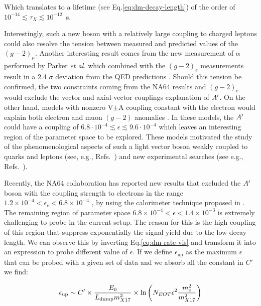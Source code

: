 Which translates to a lifetime (see Eq.\ref{eq:dm-decay-length}) of the order of $10^{-14}\lesssim \tau_X \lesssim 10^{-12}$~s.

Interestingly, such a new boson with a relatively large coupling to charged leptons could also resolve the tension between measured and predicted values of the $(g - 2)_{\mu}$. Another interesting result comes from the new measurement of $\alpha$ performed by Parker \textit{et al.} \cite{Parker191} which combined with the $(g-2)_e$ measurements result in a 2.4 $\sigma$ deviation from the QED predictions \cite{PhysRevLett.100.120801}. Should this tension be confirmed, the two constraints coming from the NA64 results and $(g - 2)_e$ would exclude the vector and axial-vector couplings explanation of $A'$. On the other hand, models with nonzero V$\pm$A coupling constant with the electron would explain both electron and muon $(g - 2)$ anomalies \cite{Krasnikov:2019dgh}. In these models, the $A'$ could have a coupling of $6.8\cdot 10^{-4} \lesssim \epsilon \lesssim 9.6 \cdot 10^{-4}$ which leaves an interesting region of the parameter space to be explored. These models motivated the study of the phenomenological aspects of such a light vector boson weakly coupled to quarks and leptons (see, e.g., Refs.~\cite{fayet1, fayet2, fayet3, fayet4,jk, cheng, Zhang:2017zap, ia, liang, bart}) and new experimental searches (see e.g., Refs.~\cite{battaglieri2017cosmic, nardi}).

Recently, the NA64 collaboration has reported new results that excluded the $A'$ boson  with the coupling strength  to electrons in the range $1.2 \times 10^{-4} < \epsilon_e < 6.8 \times 10^{-4}$ \cite{Banerjee:2018vgk,Banerjee:2019hmi}, by using the calorimeter technique proposed in \cite{Gninenko:2013rka,Andreas:2013lya}. The remaining region of parameter space $6.8 \times 10^{-4} < \epsilon < 1.4 \times 10^{-3}$ is extremely challenging to probe in the current setup. The reason for this is the high coupling of this region that suppress exponentially the signal yield due to the low decay length. We can observe this by inverting Eq.\ref{eq:dm-rate-vis} and transform it into an expression to probe different value of $\epsilon$. If we define $\epsilon_{\textrm{up}}$ as the maximum $\epsilon$ that can be probed with a given set of data and we absorb all the constant in $C'$ we find:

\begin{equation}
  \label{eq:x17-coverage}
  \epsilon_{\textrm{up}} \sim C' \times \frac{E_0}{L_{\textrm{dump}}m^2_{X17}} \times \ln{\left(N_{EOT} \epsilon^2 \frac{m_e^2}{m_{X17}^2}\right)}
\end{equation}

